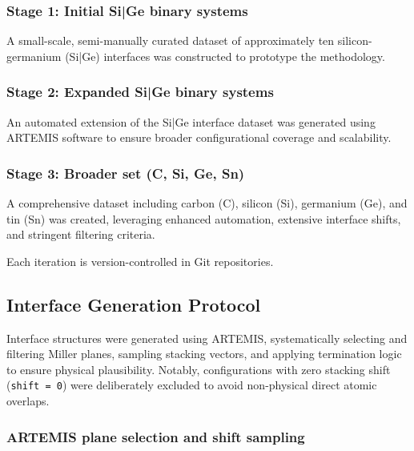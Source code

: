 \subsubsection{Stage 1: Initial Si|Ge binary systems}

A small-scale, semi-manually curated dataset of approximately ten silicon-germanium (Si|Ge) interfaces was constructed to prototype the methodology.

\subsubsection{Stage 2: Expanded Si|Ge binary systems}

An automated extension of the Si|Ge interface dataset was generated using ARTEMIS software to ensure broader configurational coverage and scalability.

\subsubsection{Stage 3: Broader set (C, Si, Ge, Sn)}

A comprehensive dataset including carbon (C), silicon (Si), germanium (Ge), and tin (Sn) was created, leveraging enhanced automation, extensive interface shifts, and stringent filtering criteria.

Each iteration is version-controlled in Git repositories.


\subsection{Interface Generation Protocol}

Interface structures were generated using ARTEMIS, systematically selecting and filtering Miller planes, sampling stacking vectors, and applying termination logic to ensure physical plausibility. Notably, configurations with zero stacking shift (\texttt{shift = 0}) were deliberately excluded to avoid non-physical direct atomic overlaps.

\subsubsection{ARTEMIS plane selection and shift sampling}


